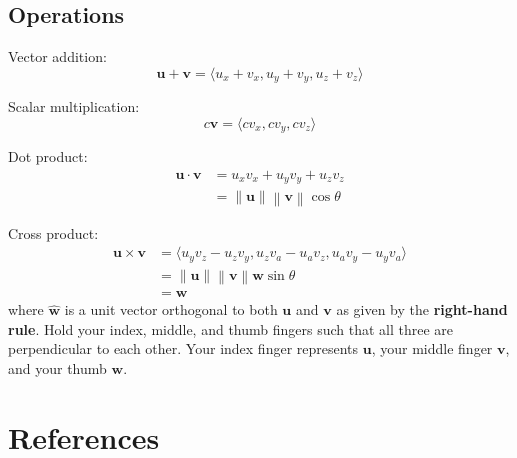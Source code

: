 \documentclass[a4paper, titlepage]{book}
\begin{document}
\section{Operations}

Vector addition:
\begin{equation}
    \bm{u} + \bm{v} = \langle u_x + v_x, u_y + v_y, u_z + v_z \rangle
\end{equation}

Scalar multiplication:
\begin{equation}
    c \bm{v} = \langle c v_x, c v_y, c v_z \rangle
\end{equation}

Dot product:
\begin{equation}
    \begin{aligned}
        \bm{u} \cdot \bm{v} &= u_x v_x + u_y v_y + u_z v_z \\
        &= \left\|\bm{u}\right\| \left\|\bm{v}\right\| \cos\theta
    \end{aligned}
\end{equation}

Cross product:
\begin{equation}
    \begin{aligned}
        \bm{u} \times \bm{v}
        &= \langle u_y v_z - u_z v_y, u_z v_a - u_a v_z, u_a v_y - u_y v_a\rangle \\
        &= \left\|\bm{u}\right\| \left\|\bm{v}\right\| \bm{\hat{w}} \sin\theta \\
        &= \bm{w}
    \end{aligned}
\end{equation}
where \(\bm{\hat{w}}\) is a unit vector
orthogonal to both \(\bm{u}\) and \(\bm{v}\)
as given by the \textbf{right-hand rule}.
Hold your index, middle, and thumb fingers
such that all three are perpendicular to each other.
Your index finger represents \(\bm{u}\),
your middle finger \(\bm{v}\),
and your thumb \(\bm{w}\).

\backmatter
\chapter{References}
\end{document}
